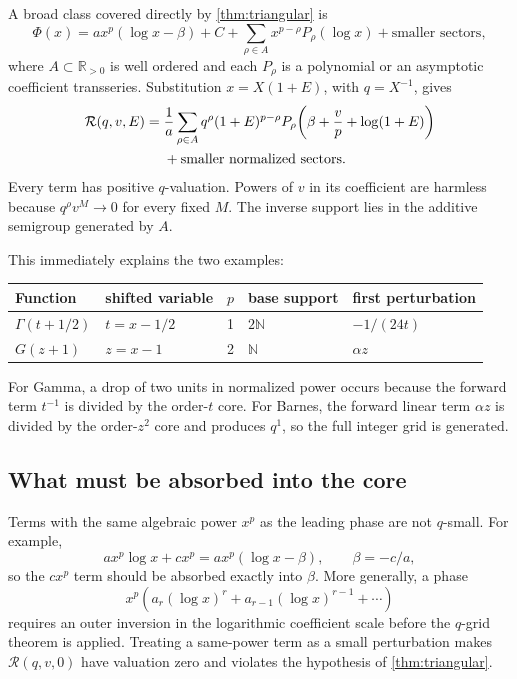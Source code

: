 \documentclass[11pt,oneside]{article}
\theoremstyle{plain}
\theoremstyle{definition}
\theoremstyle{remark}
\newcommand{\R}{\mathbb{R}}
\newcommand{\N}{\mathbb{N}}
\newcommand{\Rcal}{\mathcal{R}}
\begin{document}
A broad class covered directly by \cref{thm:triangular} is
\begin{equation}
 \Phi(x)=a x^p(\log x-\beta)+C
 +\sum_{\rho\in A}x^{p-\rho}P_\rho(\log x)
 +\text{smaller sectors},
 \label{eq:general-polylog-phase}
\end{equation}
where \(A\subset\R_{>0}\) is well ordered and each \(P_\rho\) is a
polynomial or an asymptotic coefficient transseries.  Substitution
\(x=X(1+E)\), with \(q=X^{-1}\), gives
\begin{align}
 \Rcal(q,v,E)={}&\frac1a\sum_{\rho\in A}q^\rho
 (1+E)^{p-\rho}
 P_\rho\!\left(\beta+\frac vp+\log(1+E)\right)
 \notag\\
 &+\text{smaller normalized sectors}.
 \label{eq:general-polylog-normalized}
\end{align}
Every term has positive \(q\)-valuation.  Powers of \(v\) in its coefficient
are harmless because \(q^\rho v^M\to0\) for every fixed \(M\).  The inverse
support lies in the additive semigroup generated by \(A\).

This immediately explains the two examples:
\begin{center}
\begin{tabular}{lllll}
\toprule
Function & shifted variable & \(p\) & base support & first perturbation\\
\midrule
\(\Gamma(t+1/2)\) & \(t=x-1/2\) & 1 & \(2\N\) & \(-1/(24t)\)\\
\(G(z+1)\) & \(z=x-1\) & 2 & \(\N\) & \(\alpha z\)\\
\bottomrule
\end{tabular}
\end{center}
For Gamma, a drop of two units in normalized power occurs because the forward
term \(t^{-1}\) is divided by the order-\(t\) core.  For Barnes, the forward
linear term \(\alpha z\) is divided by the order-\(z^2\) core and produces
\(q^1\), so the full integer grid is generated.

\subsection{What must be absorbed into the core}

Terms with the same algebraic power \(x^p\) as the leading phase are not
\(q\)-small.  For example,
\[
 a x^p\log x+c x^p=a x^p(\log x-\beta),
 \qquad \beta=-c/a,
\]
so the \(cx^p\) term should be absorbed exactly into \(\beta\).  More generally,
a phase
\begin{equation}
 x^p\left(a_r(\log x)^r+a_{r-1}(\log x)^{r-1}+\cdots\right)
 \label{eq:same-power-log-poly}
\end{equation}
requires an outer inversion in the logarithmic coefficient scale before the
\(q\)-grid theorem is applied.  Treating a same-power term as a small
perturbation makes \(\Rcal(q,v,0)\) have valuation zero and violates the
hypothesis of \cref{thm:triangular}.
\end{document}
